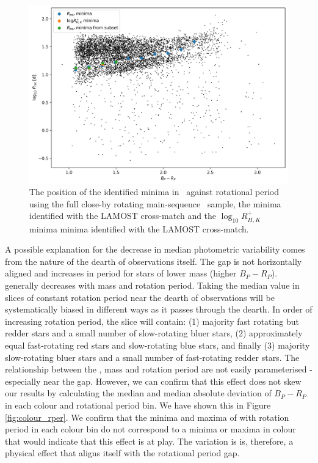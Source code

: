 \begin{figure}
\centering
    \includegraphics[width=\textwidth]{Figures/rot_gap_figures/rot_dist_minima_shown.png}
    \caption{
    The position of the identified minima in \rper{} \ against rotational period using the full close-by rotating main-sequence \kepler{} \ sample, the \rper{} minima identified with the \kepler{} LAMOST cross-match and the $\log_{10} R^{+}_{H,K}$ minima minima identified with the \kepler{} LAMOST cross-match.}
    \label{fig:indicating_minima}
\end{figure}

A possible explanation for the decrease in median photometric variability comes from the nature of the dearth of observations itself.
The gap is not horizontally aligned and increases in period for stars of lower mass (higher $B_P-R_P$).
\rper{} generally decreases with mass and rotation period.
Taking the median value in slices of constant rotation period near the dearth of observations will be systematically biased in different ways as it passes through the dearth.
In order of increasing rotation period, the slice will contain: (1) majority fast rotating but redder stars and a small number of slow-rotating bluer stars, (2) approximately equal fast-rotating red stars and slow-rotating blue stars, and finally (3) majority slow-rotating bluer stars and a small number of fast-rotating redder stars.
The relationship between the \rper{}, mass and rotation period are not easily parameterised - especially near the gap.
However, we can confirm that this effect does not skew our results by calculating the median and median absolute deviation of $B_P-R_P$ in each colour and rotational period bin.
We have shown this in Figure \ref{fig:colour_rper}.
We confirm that the minima and maxima of \rper{} with rotation period in each colour bin do not correspond to a minima or maxima in colour that would indicate that this effect is at play.
The variation is \rper{} is, therefore, a physical effect that aligns itself with the rotational period gap.

